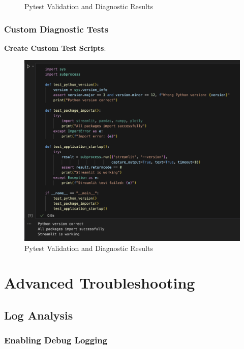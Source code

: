 \begin{figure}[H]
	\centering
	\caption{Pytest Validation and Diagnostic Results}
	\label{fig:pytest_validation}
\end{figure}

\subsubsection{Custom Diagnostic Tests}

\textbf{Create Custom Test Scripts}:
\begin{figure}[H]
	\centering
		\includegraphics[width=1\textwidth]{Images/08Troubleshooting/CustomTestScripts.png}
	\caption{Pytest Validation and Diagnostic Results}
	\label{fig:CustomTestScripts}
\end{figure}

\section{Advanced Troubleshooting}

\subsection{Log Analysis}

\subsubsection{Enabling Debug Logging}

